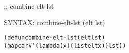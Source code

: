 \begin{aibox}{\function}
;; combine-elt-lst

SYNTAX: combine-elt-lst (elt lst)
\end{aibox}

\begin{aibox}{\examples}

\end{aibox}

\begin{aibox}{\comments}

\end{aibox}
\begin{aibox}{\answers}

\end{aibox}
\begin{aibox}{\othercomments}

\end{aibox}
\begin{aibox}{\pseudocode}

\end{aibox}
\begin{aibox}{\code}

\begin{alltt}
(defun combine-elt-lst (elt lst)
            (mapcar #'(lambda (x) (list elt x)) lst))

\end{alltt}
\end{aibox}
